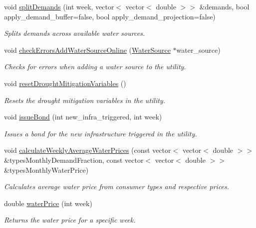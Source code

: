 \begin{DoxyCompactItemize}
void \mbox{\hyperlink{classUtility_aca42b14087c3184d4fec10a2e8729c05}{split\+Demands}} (int week, vector$<$ vector$<$ double $>$$>$ \&demands, bool apply\+\_\+demand\+\_\+buffer=false, bool apply\+\_\+demand\+\_\+projection=false)
\begin{DoxyCompactList}\small\item\em Splits demands across available water sources. \end{DoxyCompactList}\item 
void \mbox{\hyperlink{classUtility_a0674d7d95f4d6595f7e01817a4d84a98}{check\+Errors\+Add\+Water\+Source\+Online}} (\mbox{\hyperlink{classWaterSource}{Water\+Source}} $\ast$water\+\_\+source)
\begin{DoxyCompactList}\small\item\em Checks for errors when adding a water source to the utility. \end{DoxyCompactList}\item 
void \mbox{\hyperlink{classUtility_af9ec9c2cb69166db021f03ce9ddf4d8e}{reset\+Drought\+Mitigation\+Variables}} ()
\begin{DoxyCompactList}\small\item\em Resets the drought mitigation variables in the utility. \end{DoxyCompactList}\item 
void \mbox{\hyperlink{classUtility_a152ceea2917ea7715e8fbf8aff24390f}{issue\+Bond}} (int new\+\_\+infra\+\_\+triggered, int week)
\begin{DoxyCompactList}\small\item\em Issues a bond for the new infrastructure triggered in the utility. \end{DoxyCompactList}\item 
void \mbox{\hyperlink{classUtility_a0189edb631c9596f094b15afeeb934fd}{calculate\+Weekly\+Average\+Water\+Prices}} (const vector$<$ vector$<$ double $>$$>$ \&types\+Monthly\+Demand\+Fraction, const vector$<$ vector$<$ double $>$$>$ \&types\+Monthly\+Water\+Price)
\begin{DoxyCompactList}\small\item\em Calculates average water price from consumer types and respective prices. \end{DoxyCompactList}\item 
double \mbox{\hyperlink{classUtility_a0dca2586b9ed761cdab3b0a344daf21c}{water\+Price}} (int week)
\begin{DoxyCompactList}\small\item\em Returns the water price for a specific week. \end{DoxyCompactList}\item 
$$
\end{DoxyCompactItemize}
